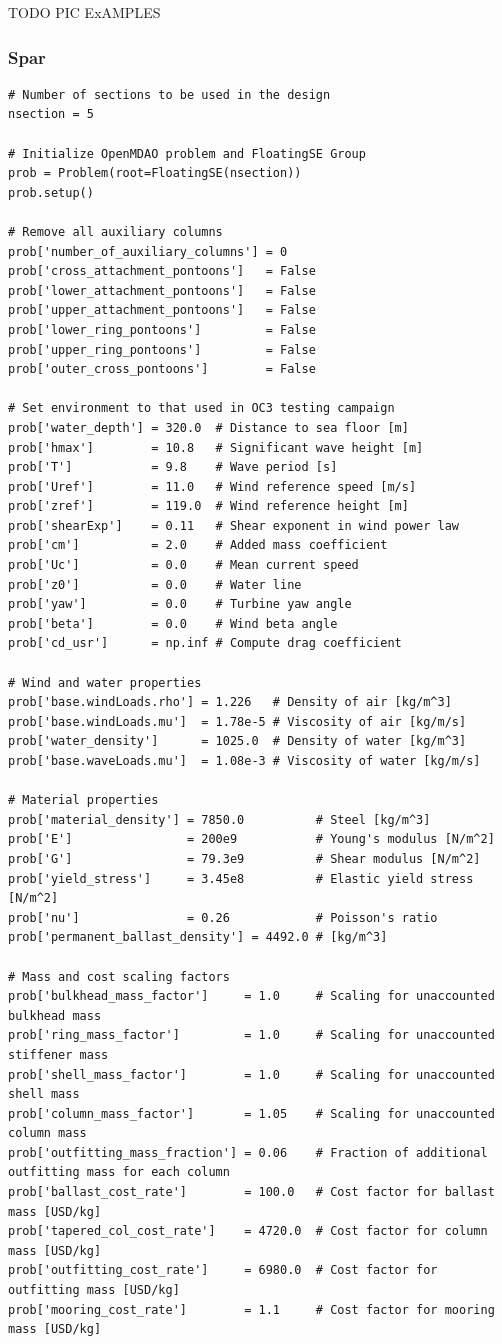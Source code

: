 TODO PIC ExAMPLES

\subsubsection{Spar}
\begin{lstlisting}
# Number of sections to be used in the design
nsection = 5

# Initialize OpenMDAO problem and FloatingSE Group
prob = Problem(root=FloatingSE(nsection))
prob.setup()

# Remove all auxiliary columns
prob['number_of_auxiliary_columns'] = 0
prob['cross_attachment_pontoons']   = False
prob['lower_attachment_pontoons']   = False
prob['upper_attachment_pontoons']   = False
prob['lower_ring_pontoons']         = False
prob['upper_ring_pontoons']         = False
prob['outer_cross_pontoons']        = False

# Set environment to that used in OC3 testing campaign
prob['water_depth'] = 320.0  # Distance to sea floor [m]
prob['hmax']        = 10.8   # Significant wave height [m]
prob['T']           = 9.8    # Wave period [s]
prob['Uref']        = 11.0   # Wind reference speed [m/s]
prob['zref']        = 119.0  # Wind reference height [m]
prob['shearExp']    = 0.11   # Shear exponent in wind power law
prob['cm']          = 2.0    # Added mass coefficient
prob['Uc']          = 0.0    # Mean current speed
prob['z0']          = 0.0    # Water line
prob['yaw']         = 0.0    # Turbine yaw angle
prob['beta']        = 0.0    # Wind beta angle
prob['cd_usr']      = np.inf # Compute drag coefficient

# Wind and water properties
prob['base.windLoads.rho'] = 1.226   # Density of air [kg/m^3]
prob['base.windLoads.mu']  = 1.78e-5 # Viscosity of air [kg/m/s]
prob['water_density']      = 1025.0  # Density of water [kg/m^3]
prob['base.waveLoads.mu']  = 1.08e-3 # Viscosity of water [kg/m/s]

# Material properties
prob['material_density'] = 7850.0          # Steel [kg/m^3]
prob['E']                = 200e9           # Young's modulus [N/m^2]
prob['G']                = 79.3e9          # Shear modulus [N/m^2]
prob['yield_stress']     = 3.45e8          # Elastic yield stress [N/m^2]
prob['nu']               = 0.26            # Poisson's ratio
prob['permanent_ballast_density'] = 4492.0 # [kg/m^3]

# Mass and cost scaling factors
prob['bulkhead_mass_factor']     = 1.0     # Scaling for unaccounted bulkhead mass
prob['ring_mass_factor']         = 1.0     # Scaling for unaccounted stiffener mass
prob['shell_mass_factor']        = 1.0     # Scaling for unaccounted shell mass
prob['column_mass_factor']       = 1.05    # Scaling for unaccounted column mass
prob['outfitting_mass_fraction'] = 0.06    # Fraction of additional outfitting mass for each column
prob['ballast_cost_rate']        = 100.0   # Cost factor for ballast mass [USD/kg]
prob['tapered_col_cost_rate']    = 4720.0  # Cost factor for column mass [USD/kg]
prob['outfitting_cost_rate']     = 6980.0  # Cost factor for outfitting mass [USD/kg]
prob['mooring_cost_rate']        = 1.1     # Cost factor for mooring mass [USD/kg]


\end{lstlisting}

